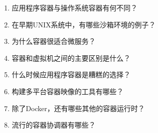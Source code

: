 \begin{enumerate}
\item
应用程序容器与操作系统容器有何不同？

\item
在早期UNIX系统中，有哪些沙箱环境的例子？

\item
为什么容器很适合微服务？

\item
容器和虚拟机之间的主要区别是什么？

\item
什么时候应用程序容器是糟糕的选择？

\item
构建多平台容器映像的工具有哪些？

\item
除了Docker，还有哪些其他的容器运行时？

\item
流行的容器协调器有哪些？
\end{enumerate}